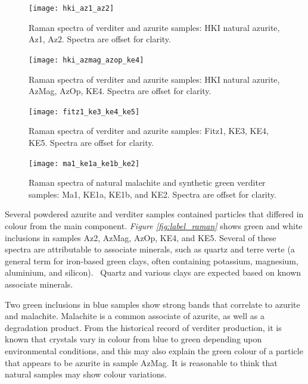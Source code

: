 \begin{figure}[H]
\centering
  \texttt{[image: hki\_az1\_az2]}
\caption[Raman spectra of blue samples.]{Raman spectra of verditer and azurite samples: HKI natural azurite, Az1, Az2. Spectra are offset for clarity.}
\label{fig:blue_comparison1}
\end{figure}

\begin{figure}[H]
  \centering
  \texttt{[image: hki\_azmag\_azop\_ke4]}
\caption[Raman spectra of blue samples.]{Raman spectra of verditer and azurite samples: HKI natural azurite, AzMag, AzOp, KE4. Spectra are offset for clarity.}
\label{fig:blue_comparison2}
\end{figure}

\begin{figure}[H]
  \centering
  \texttt{[image: fitz1\_ke3\_ke4\_ke5]}
\caption[Raman spectra of blue samples.]{Raman spectra of verditer and azurite samples: Fitz1, KE3, KE4, KE5. Spectra are offset for clarity.}
\label{fig:blue_comparison3}
\end{figure}

\begin{figure}[H]
\centering
  \texttt{[image: ma1\_ke1a\_ke1b\_ke2]}
\caption[Raman spectra of green samples.]{Raman spectra of natural malachite and synthetic green verditer samples: Ma1, KE1a, KE1b, and KE2. Spectra are offset for clarity.}
\label{fig:green_comparison}
\end{figure}

Several powdered azurite and verditer samples contained particles that differed in colour from the main component. \textit{Figure \ref{fig:label_raman}} shows green and white inclusions in samples Az2, AzMag, AzOp, KE4, and KE5. Several of these spectra are attributable to associate minerals, such as quartz and terre verte (a general term for iron-based green clays, often containing potassium, magnesium, aluminium, and silicon).~\autocite{ucl_database,cameo_mfa,irug_quartz} Quartz and various clays are expected based on known associate minerals.

Two green inclusions in blue samples show strong bands that correlate to azurite and malachite. Malachite is a common associate of azurite, as well as a degradation product. From the historical record of verditer production, it is known that crystals vary in colour from blue to green depending upon environmental conditions, and this may also explain the green colour of a particle that appears to be azurite in sample AzMag. It is reasonable to think that natural samples may show colour variations. 

